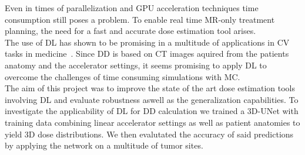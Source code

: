 Even in times of parallelization and GPU acceleration techniques time consumption still poses a problem.
To enable real time MR-only treatment planning, the need for a fast and accurate dose estimation tool arises.\\
The use of \ac{DL} has shown to be promising in a multitude of applications in \ac{CV} tasks in medicine~\cite{esteva_dermatologist-level_2017,cheng_computer-aided_2016,cicero_training_2017,iizuka_deep_2020,poplin_prediction_2018}.
Since \acs{DD} is based on CT images aquired from the patients anatomy and the accelerator settings, it seems promising to apply \acs{DL} to overcome the challenges of time consuming simulations with \acs{MC}.\\
The aim of this project was to improve the state of the art dose estimation tools involving \acs{DL} and evaluate robustness aswell as the generalization capabilities.
To investigate the applicability of \acs{DL} for \acs{DD} calculation we trained a 3D-UNet with training data combining linear accelerator settings as well as patient anatomies to yield 3D dose distributions. 
We then evalutated the accuracy of said predictions by applying the network on a multitude of tumor sites. 
